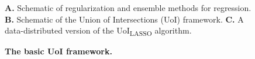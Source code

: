 \documentclass[10pt,letterpaper]{article}
\begin{document}
\begin{figure}[!htp]
\hspace{-2in}
\caption{{\bf The basic UoI framework.}}
\textbf{A.} Schematic of regularization and ensemble methods for regression. \textbf{B.} Schematic of the Union of Intersections (UoI) framework. \textbf{C.} A data-distributed version of the UoI\textsubscript{LASSO} algorithm.
\end{figure}
\end{document}
